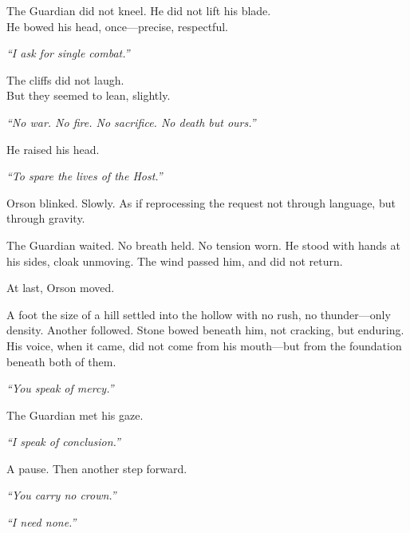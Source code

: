 \documentclass[12pt]{article}
\begin{document}
\vspace{0.5em}
The Guardian did not kneel. He did not lift his blade.\\
He bowed his head, once---precise, respectful.

\vspace{0.5em}
\textit{``I ask for single combat.''}

\vspace{0.5em}
The cliffs did not laugh.\\
But they seemed to lean, slightly.

\vspace{0.5em}
\textit{``No war. No fire. No sacrifice. No death but ours.''}

\vspace{0.5em}
He raised his head.

\vspace{0.5em}
\textit{``To spare the lives of the Host.''}

\vspace{0.5em}
Orson blinked. Slowly. As if reprocessing the request not through language, but through gravity.

\vspace{0.5em}
The Guardian waited. No breath held. No tension worn. He stood with hands at his sides, cloak unmoving. The wind passed him, and did not return.

\vspace{0.5em}
At last, Orson moved.

\vspace{0.5em}
A foot the size of a hill settled into the hollow with no rush, no thunder---only density. Another followed. Stone bowed beneath him, not cracking, but enduring. His voice, when it came, did not come from his mouth---but from the foundation beneath both of them.

\vspace{0.5em}
\textit{``You speak of mercy.''}

\vspace{0.5em}
The Guardian met his gaze.

\vspace{0.5em}
\textit{``I speak of conclusion.''}

\vspace{0.5em}
A pause. Then another step forward.

\vspace{0.5em}
\textit{``You carry no crown.''}

\vspace{0.5em}
\textit{``I need none.''}
\end{document}
